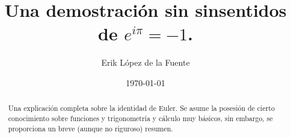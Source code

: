 \documentclass[a4paper, titlepage]{article}
\title{Una demostración sin sinsentidos de $e^{i\pi} = -1$.}
\author{Erik López de la Fuente}
\date{\today}
\begin{document}
\maketitle

\begin{abstract}
	Una explicación completa sobre la identidad de Euler. Se asume la posesión de cierto conocimiento sobre funciones y trigonometría y cálculo muy básicos, sin embargo, se proporciona un breve (aunque no riguroso) resumen.
\end{abstract}

\tableofcontents
\newpage







\end{document}
